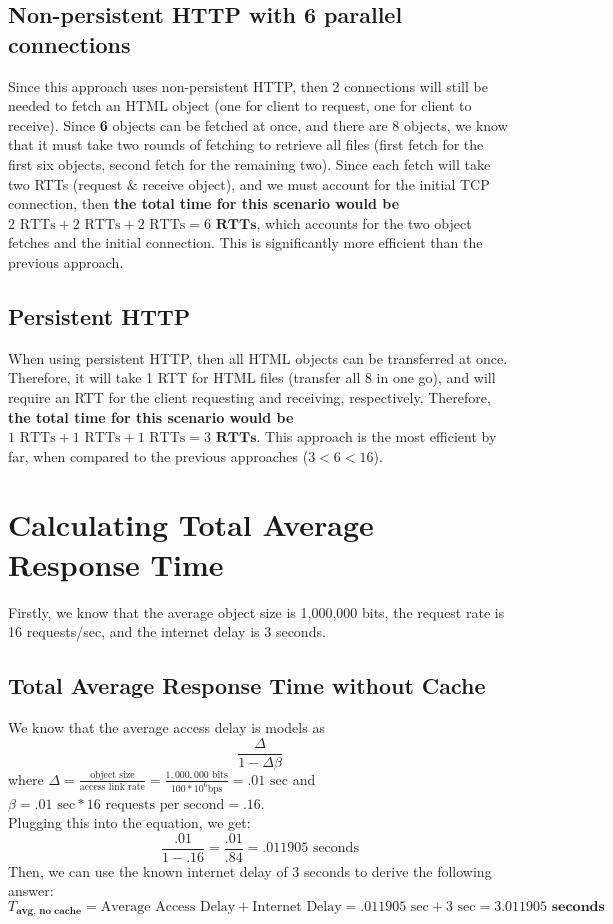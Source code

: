 \documentclass{article}
\begin{document}
\subsection{Non-persistent HTTP with 6 parallel connections}
Since this approach uses non-persistent HTTP, then 2 connections will still be needed to fetch an HTML object (one for client to request, one for client to receive). Since \textbf{6} objects can be fetched at once, and there are 8 objects, we know that it must take two rounds of fetching to retrieve all files (first fetch for the first six objects, second fetch for the remaining two). Since each fetch will take two RTTs (request \& receive object), and we must account for the initial TCP connection, then \textbf{the total time for this scenario would be $2 \text{ RTTs}+ 2 \text{ RTTs} + 2 \text{ RTTs} = 6 \textbf{ RTTs}$}, which accounts for the two object fetches and the initial connection. This is significantly more efficient than the previous approach.
\subsection{Persistent HTTP}
When using persistent HTTP, then all HTML objects can be transferred at once. Therefore, it will take 1 RTT for HTML files (transfer all 8 in one go), and will require an RTT for the client requesting and receiving, respectively. Therefore, \textbf{the total time for this scenario would be $1 \text{ RTTs}+ 1 \text{ RTTs} + 1 \text{ RTTs} = 3 \textbf{ RTTs}$}. This approach is the most efficient by far, when compared to the previous approaches ($3 < 6 < 16$).

\section{Calculating Total Average Response Time}
Firstly, we know that the average object size is 1,000,000 bits, the request rate is 16 requests/sec, and the internet delay is 3 seconds. 
\subsection{Total Average Response Time without Cache}
We know that the average access delay is models as
\[
\frac{\Delta}{1 - \Delta \beta}
\]
where $\Delta = \frac{\text{object size}}{\text{access link rate}} = \frac{1,000,000 \text{ bits}}{100 * 10^6 \text{bps}} = .01 \text{ sec}$ and $\beta = .01 \text{ sec} * 16 \text{ requests per second} = .16$. \\
Plugging this into the equation, we get:
\[
\frac{.01}{1 - .16} = \frac{.01}{.84} = .011905 \text{ seconds}
\]
Then, we can use the known internet delay of 3 seconds to derive the following answer:
\[
{T_\textbf{avg, no cache}} = \text{Average Access Delay} + \text{Internet Delay} = .011905 \text{ sec} + 3 \text{ sec} = 3.011905 \textbf{ seconds}
\]
\end{document}
